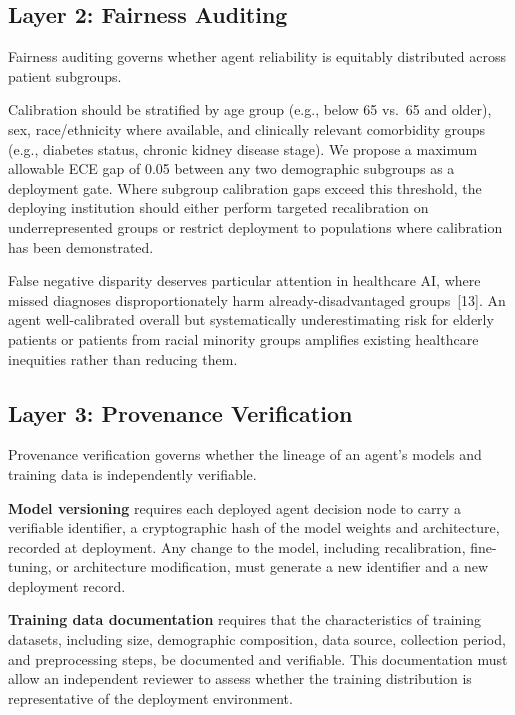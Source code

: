 \subsection{Layer 2: Fairness Auditing}\label{layer-2-fairness-auditing}

Fairness auditing governs whether agent reliability is equitably
distributed across patient subgroups.

Calibration should be stratified by age group (e.g., below 65 vs.~65
and older), sex, race/ethnicity where available, and clinically relevant
comorbidity groups (e.g., diabetes status, chronic kidney disease
stage). We propose a maximum allowable ECE gap of 0.05 between any two
demographic subgroups as a deployment gate. Where subgroup calibration
gaps exceed this threshold, the deploying institution should either
perform targeted recalibration on underrepresented groups or restrict
deployment to populations where calibration has been demonstrated.

False negative disparity deserves particular attention in healthcare AI,
where missed diagnoses disproportionately harm already-disadvantaged
groups~{[}13{]}. An agent well-calibrated overall but systematically
underestimating risk for elderly patients or patients from racial
minority groups amplifies existing healthcare inequities rather than
reducing them.

\subsection{Layer 3: Provenance Verification}\label{layer-3-provenance-verification}

Provenance verification governs whether the lineage of an agent's models
and training data is independently verifiable.

\textbf{Model versioning} requires each deployed agent decision node to
carry a verifiable identifier, a cryptographic hash of the model weights
and architecture, recorded at deployment. Any change to the model,
including recalibration, fine-tuning, or architecture modification, must
generate a new identifier and a new deployment record.

\textbf{Training data documentation} requires that the characteristics
of training datasets, including size, demographic composition, data
source, collection period, and preprocessing steps, be documented and
verifiable. This documentation must allow an independent reviewer to
assess whether the training distribution is representative of the
deployment environment.

